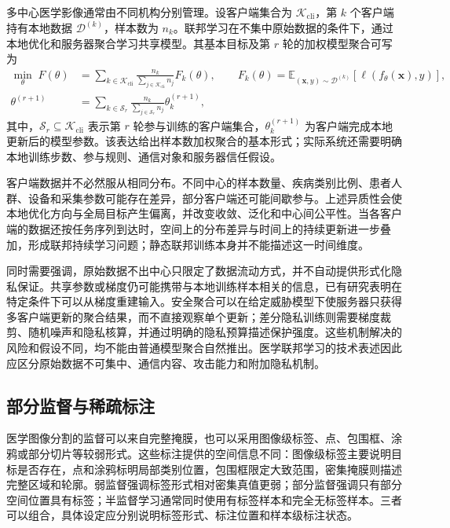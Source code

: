多中心医学影像通常由不同机构分别管理。设客户端集合为 $\mathcal{K}_{\mathrm{cli}}$，第 $k$ 个客户端持有本地数据 $\mathcal{D}^{(k)}$，样本数为 $n_k$。联邦学习在不集中原始数据的条件下，通过本地优化和服务器聚合学习共享模型。其基本目标及第 $r$ 轮的加权模型聚合可写为\cite{mcmahan2017fedavg}
\begin{equation}
\begin{aligned}
\min_{\theta}\;F(\theta)
&=
\sum_{k\in\mathcal{K}_{\mathrm{cli}}}
\frac{n_k}{\sum_{j\in\mathcal{K}_{\mathrm{cli}}} n_j}
F_k(\theta),
\qquad
F_k(\theta)
=
\mathbb{E}_{(\mathbf{x},y)\sim\mathcal{D}^{(k)}}
\!\left[\ell\!\left(f_\theta(\mathbf{x}),y\right)\right],
\\
\theta^{(r+1)}
&=
\sum_{k\in\mathcal{S}_r}
\frac{n_k}{\sum_{j\in\mathcal{S}_r}n_j}
\theta_k^{(r+1)},
\end{aligned}
\label{eq:foundations-fed-learning}
\end{equation}
其中，$\mathcal{S}_r\subseteq\mathcal{K}_{\mathrm{cli}}$ 表示第 $r$ 轮参与训练的客户端集合，$\theta_k^{(r+1)}$ 为客户端完成本地更新后的模型参数。该表达给出样本数加权聚合的基本形式；实际系统还需要明确本地训练步数、参与规则、通信对象和服务器信任假设。

客户端数据并不必然服从相同分布。不同中心的样本数量、疾病类别比例、患者人群、设备和采集参数可能存在差异，部分客户端还可能间歇参与。上述异质性会使本地优化方向与全局目标产生偏离，并改变收敛、泛化和中心间公平性\cite{rieke2020future,sheller2020federated}。当各客户端的数据还按任务序列到达时，空间上的分布差异与时间上的持续更新进一步叠加，形成联邦持续学习问题；静态联邦训练本身并不能描述这一时间维度。

同时需要强调，原始数据不出中心只限定了数据流动方式，并不自动提供形式化隐私保证。共享参数或梯度仍可能携带与本地训练样本相关的信息，已有研究表明在特定条件下可以从梯度重建输入\cite{geiping2020inverting}。安全聚合可以在给定威胁模型下使服务器只获得多客户端更新的聚合结果，而不直接观察单个更新\cite{bonawitz2017practical}；差分隐私训练则需要梯度裁剪、随机噪声和隐私核算，并通过明确的隐私预算描述保护强度\cite{abadi2016deep}。这些机制解决的风险和假设不同，均不能由普通模型聚合自然推出。医学联邦学习的技术表述因此应区分原始数据不可集中、通信内容、攻击能力和附加隐私机制。

\subsection{部分监督与稀疏标注}
\label{subsec:foundations-partial-supervision}

医学图像分割的监督可以来自完整掩膜，也可以采用图像级标签、点、包围框、涂鸦或部分切片等较弱形式\cite{tajbakhsh2020imperfect}。这些标注提供的空间信息不同：图像级标签主要说明目标是否存在，点和涂鸦标明局部类别位置，包围框限定大致范围，密集掩膜则描述完整区域和轮廓。弱监督强调标签形式相对密集真值更弱；部分监督强调只有部分空间位置具有标签；半监督学习通常同时使用有标签样本和完全无标签样本。三者可以组合，具体设定应分别说明标签形式、标注位置和样本级标注状态。


